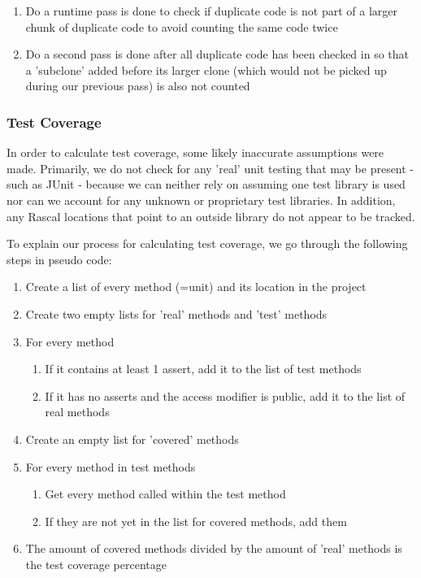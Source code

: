 \documentclass{article}
\begin{document}
\begin{enumerate}
\item Do a runtime pass is done to check if duplicate code is not part of a larger chunk of duplicate code to avoid counting the same code twice
\item Do a second pass is done after all duplicate code has been checked in so that a 'subclone' added before its larger clone (which would not be picked up during our previous pass) is also not counted
\end{enumerate}

\subsubsection{Test Coverage} \label{assumetests}
In order to calculate test coverage, some likely inaccurate assumptions were made.
Primarily, we do not check for any 'real' unit testing that may be present - such as JUnit - because we can neither rely on assuming one test library is used nor can we account for any unknown or proprietary test libraries. In addition, any Rascal locations that point to an outside library do not appear to be tracked.

To explain our process for calculating test coverage, we go through the following steps in pseudo code:

\begin{enumerate}
\item Create a list of every method (=unit) and its location in the project
\item Create two empty lists for 'real' methods and 'test' methods
\item For every method
	\begin{enumerate}
	\item If it contains at least 1 assert, add it to the list of test methods
	\item If it has no asserts and the access modifier is public, add it to the list of real methods
	\end{enumerate}
\item Create an empty list for 'covered' methods
\item For every method in test methods
	\begin{enumerate}
	\item Get every method called within the test method
	\item If they are not yet in the list for covered methods, add them
	\end{enumerate}
\item The amount of covered methods divided by the amount of 'real' methods is the test coverage percentage
\end{enumerate}
\end{document}

